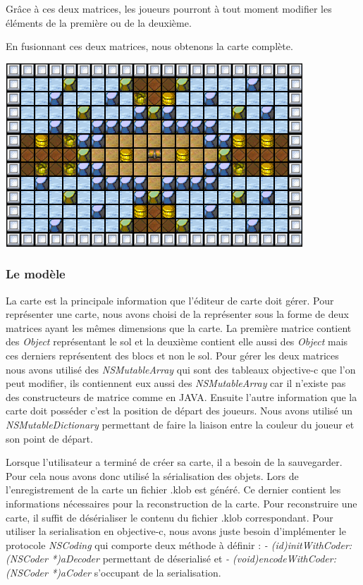 			Grâce à ces deux matrices, les joueurs pourront à tout moment modifier les éléments de la première ou de la deuxième.
			
			En fusionnant ces deux matrices, nous obtenons la carte complète.
			\begin{center}
				\includegraphics{./Developpement/Img/image3.png}
			\end{center}
			

	\subsubsection{Le modèle}
		La carte est la principale information que l'éditeur de carte doit gérer. Pour représenter une carte, nous avons choisi de la représenter sous la forme de deux matrices ayant les mêmes dimensions que la carte. La première matrice contient des \textit{Object} représentant le sol et la deuxième contient elle aussi des \textit{Object} mais ces derniers représentent des blocs et non le sol. Pour gérer les deux matrices nous avons utilisé des \textit{NSMutableArray} qui sont des tableaux \gls{objective-c} que l'on peut modifier, ils contiennent eux aussi des \textit{NSMutableArray} car il n'existe pas des constructeurs de matrice comme en JAVA. Ensuite l'autre information que la carte doit posséder c'est la position de départ des joueurs. Nous avons utilisé un \textit{NSMutableDictionary} permettant de faire la liaison entre la couleur du joueur et son point de départ. 
			
		Lorsque l'utilisateur a terminé de créer sa carte, il a besoin de la sauvegarder. Pour cela nous avons donc utilisé la sérialisation des objets. Lors de l'enregistrement de la carte un fichier \og .klob \fg  est généré. Ce dernier contient les informations nécessaires pour la reconstruction de la carte. Pour reconstruire une carte, il suffit de désérialiser le contenu du fichier \og .klob \fg correspondant. Pour utiliser la serialisation en 
		\gls{objective-c}, nous avons juste besoin d'implémenter le protocole \textit{NSCoding} qui comporte deux méthode à définir : 
		\textit{- (id)initWithCoder:(NSCoder *)aDecoder} permettant de déserialisé et \textit{- (void)encodeWithCoder:(NSCoder *)aCoder} s'occupant de la serialisation.
	
